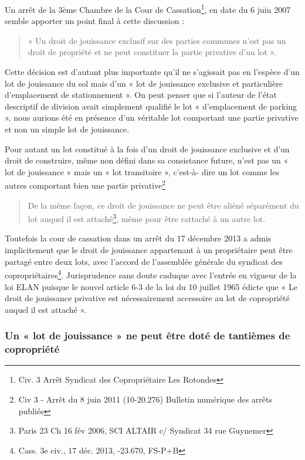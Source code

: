 			Un arrêt de la 3ème Chambre de la Cour de Cassation\footnote{Civ. 3\degre{} Arrêt  Syndicat des Copropriétaire Les Rotondes}, en date du 6 juin 2007 semble apporter un point
			final à cette discussion :
			\begin{quote}
				« Un droit de jouissance exclusif sur des parties communes n’est pas un droit de propriété et ne peut	constituer la partie privative d’un lot ».
			\end{quote}
			
			Cette décision est d’autant plus importante qu’il ne s’agissait pas en l’espèce d’un lot de jouissance du sol
			mais d’un « lot de jouissance exclusive et particulière d’emplacement de stationnement ». On peut penser
			que si l’auteur de l’état descriptif de division avait simplement qualifié le lot « d’emplacement de
			parking », nous aurions été en présence d’un véritable lot comportant une partie privative et non un
			simple lot de jouissance.
			
			Pour autant un lot constitué à la fois d’un droit de jouissance exclusive et d’un droit de construire, même
			non défini dans sa consistance future, n’est pas un « lot de jouissance » mais un « lot transitoire », c’est-à-
			dire un lot comme les autres comportant bien une partie privative\footnote{Civ 3\degre{} - Arrêt  du 8 juin 2011 (10-20.276) Bulletin numérique des arrêts publiés}
			\begin{quote}
				De la même façon, ce droit de jouissance ne peut être aliéné séparément du lot auquel	il est attaché\footnote{Paris 23\degre{} Ch 16 fév 2006, SCI ALTAIR c/ Syndicat 34 rue Guynemer}, même pour être rattaché à un autre lot.
			\end{quote}
			
			Toutefois la cour de cassation dans un arrêt du 17 décembre 2013 a admis implicitement que le droit de
			jouissance appartenant à un propriétaire peut être partagé entre deux lots, avec l’accord de l’assemblée
			générale du syndicat des copropriétaires\footnote{Cass. 3e civ., 17 déc. 2013, -23.670, FS-P+B}.
			Jurisprudence sans doute caduque avec l’entrée en vigueur de la loi ELAN puisque le nouvel article 6-3 de
			la loi du 10 juillet 1965 édicte que « Le droit de jouissance privative est nécessairement accessoire au lot
			de copropriété auquel il est attaché ».
		
		\subsubsection{Un « lot de jouissance » ne peut être doté de tantièmes de copropriété}
		

